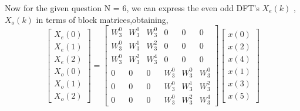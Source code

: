 \documentclass[journal,12pt,twocolumn]{IEEEtran}
\renewcommand\thesection{\arabic{section}}
\begin{document}
\begin{enumerate}[label=\thesection.\arabic*.,ref=\thesection.\theenumi]
Now for the given question  N = 6, we can express the even odd DFT's $X_{e}(k)$ , $X_{o}(k)$ in terms of block  matrices,obtaining,
\begin{equation}
\begin{bmatrix}
X_{e}(0) \\ 
X_{e}(1) \\ 
X_{e}(2) \\ 
X_{o}(0) \\ 
X_{o}(1) \\ 
X_{o}(2)
\end{bmatrix}
=
\begin{bmatrix}
W^{0}_{3} & W^{0}_{3} & W^{0}_{3} & 0 & 0 & 0\\
W^{0}_{3} & W^{1}_{3} & W^{2}_{3} & 0 & 0 & 0\\
W^{0}_{3} & W^{2}_{3} & W^{4}_{3} & 0 & 0 & 0\\
0 & 0 & 0 & W^{0}_{3} & W^{0}_{3} & W^{0}_{3}\\
0 & 0 & 0 & W^{0}_{3} & W^{1}_{3} & W^{2}_{3}\\
0 & 0 & 0 & W^{0}_{3} & W^{2}_{3} & W^{4}_{3}
\end{bmatrix}
\begin{bmatrix}
x(0) \\ 
x(2) \\ 
x(4) \\ 
x(1) \\ 
x(3) \\ 
x(5) 
\end{bmatrix}   
\end{equation}
    

\end{enumerate}
\end{document}
